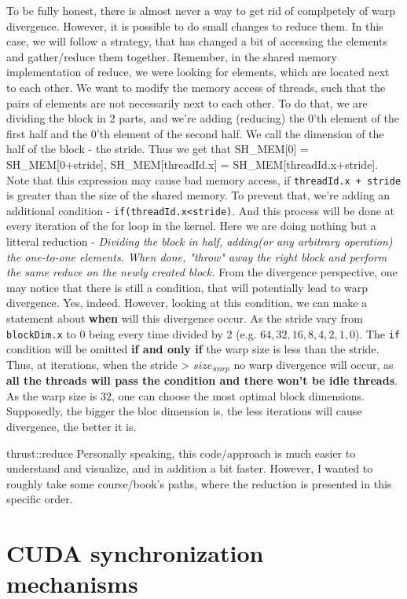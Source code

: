 \documentclass[12pt]{article}
\begin{document}
To be fully honest, there is almost never a way to get rid of complpetely of warp divergence.
However, it is possible to do small changes to reduce them. 
In this case, we will follow a strategy, that has changed a bit of accessing the elements and 
gather/reduce them together. Remember, in the shared memory implementation of reduce, we were 
looking for elements, which are located next to each other. 
We want to modify the memory access of threads, such that the pairs of elements are not necessarily next to each other. To do that, we are dividing the block in 2 parts, and we're adding (reducing) the 
0'th element of the first half and the 0'th element of the second half. We call the dimension
of the half of the block - the stride. Thus we get that SH\_MEM[0] = SH\_MEM[0+stride], 
SH\_MEM[threadId.x] = SH\_MEM[threadId.x+stride]. Note that this expression may cause bad memory 
access, if \verb|threadId.x + stride| is greater than the size of the shared memory. To prevent that, 
we're adding an additional condition - \verb|if(threadId.x<stride)|.
And this process will be done at every iteration
of the for loop in the kernel. Here we are doing nothing but a litteral reduction - \textit{Dividing
the block in half, adding(or any arbitrary operation) the one-to-one elements. When done, 
"throw" away the right block and perform the same reduce on the newly created block.}
From the divergence perspective, one may notice that there is still a condition, that will potentially
lead to warp divergence. Yes, indeed. However, looking at this condition, we can make a statement 
about \textbf{when} will this divergence occur. As the stride vary from \verb|blockDim.x| to 
$0$ being every time divided by 2 (e.g. $64, 32, 16, 8, 4, 2, 1, 0$). The \verb|if| condition will be
omitted \textbf{if and only if} the warp size is less than the stride. Thus, at iterations, when
the stride > $size_{warp}$ no warp divergence will occur, as \textbf{all the threads will pass the condition and there won't be idle threads}. As the warp size is $32$, one can choose the most optimal block dimensions.
Supposedly, the bigger the bloc dimension is, the less iterations will cause divergence, the better it is. 

thrust::reduce
Personally speaking, this code/approach is much easier to understand and visualize, and in addition
a bit faster. However, I wanted to roughly take some course/book's paths, where the reduction is 
presented in this specific order.


\section{CUDA synchronization mechanisms}
\end{document}
